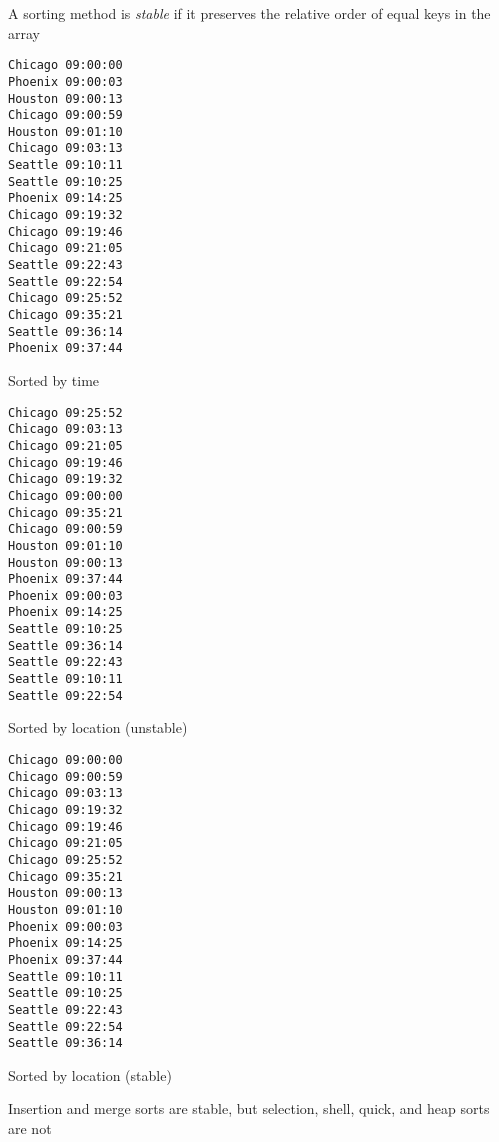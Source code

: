 \documentclass[8pt,a4paper,compress]{beamer}
\begin{document}
\begin{frame}[fragile]
A sorting method is \emph{stable} if it preserves the relative order of equal keys in the array

\begin{minipage}{65pt}
\begin{lstlisting}[language={},backgroundcolor=\color{white}]
Chicago 09:00:00
Phoenix 09:00:03
Houston 09:00:13
Chicago 09:00:59
Houston 09:01:10
Chicago 09:03:13
Seattle 09:10:11
Seattle 09:10:25
Phoenix 09:14:25
Chicago 09:19:32
Chicago 09:19:46
Chicago 09:21:05
Seattle 09:22:43
Seattle 09:22:54
Chicago 09:25:52
Chicago 09:35:21
Seattle 09:36:14
Phoenix 09:37:44
\end{lstlisting}
\begin{center}
\tiny Sorted by time
\end{center}
\end{minipage}\hfill
\begin{minipage}{65pt}
\begin{lstlisting}[language={},backgroundcolor=\color{white}]
Chicago 09:25:52
Chicago 09:03:13
Chicago 09:21:05
Chicago 09:19:46
Chicago 09:19:32
Chicago 09:00:00
Chicago 09:35:21
Chicago 09:00:59
Houston 09:01:10
Houston 09:00:13
Phoenix 09:37:44
Phoenix 09:00:03
Phoenix 09:14:25
Seattle 09:10:25
Seattle 09:36:14
Seattle 09:22:43
Seattle 09:10:11
Seattle 09:22:54
\end{lstlisting}
\begin{center}
\tiny Sorted by location (unstable)
\end{center}
\end{minipage}\hfill
\begin{minipage}{65pt}
\begin{lstlisting}[language={},backgroundcolor=\color{white}]
Chicago 09:00:00
Chicago 09:00:59
Chicago 09:03:13
Chicago 09:19:32
Chicago 09:19:46
Chicago 09:21:05
Chicago 09:25:52
Chicago 09:35:21
Houston 09:00:13
Houston 09:01:10
Phoenix 09:00:03
Phoenix 09:14:25
Phoenix 09:37:44
Seattle 09:10:11
Seattle 09:10:25
Seattle 09:22:43
Seattle 09:22:54
Seattle 09:36:14
\end{lstlisting}
\begin{center}
\tiny Sorted by location (stable)
\end{center}
\end{minipage}

\bigskip

Insertion and merge sorts are stable, but selection, shell, quick, and heap sorts are not
\end{frame}
\end{document}
